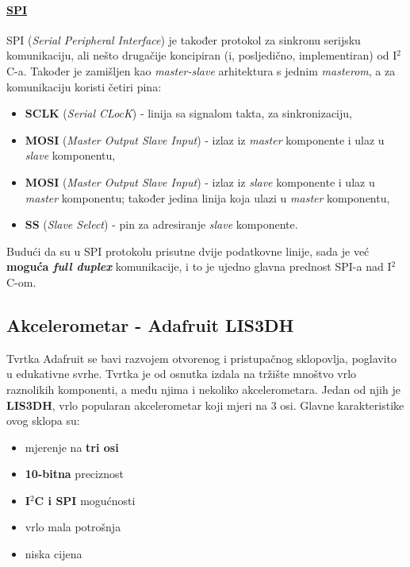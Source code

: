 \documentclass[12pt,a4paper]{article}
\begin{document}
	\paragraph{\underline{SPI}} %
	\label{par:spi}
		SPI (\textit{Serial Peripheral Interface}) je također protokol za sinkronu serijsku komunikaciju, ali nešto drugačije koncipiran (i, posljedično, implementiran) od I$^2$C-a. Također je zamišljen kao \textit{master-slave} arhitektura s jednim \textit{masterom}, a za komunikaciju koristi četiri pina:
		\begin{itemize}
			\item \textbf{SCLK} (\textit{Serial CLocK}) - linija sa signalom takta, za sinkronizaciju,
			\item \textbf{MOSI} (\textit{Master Output Slave Input}) - izlaz iz \textit{master} komponente i ulaz u \textit{slave} komponentu,
			\item \textbf{MOSI} (\textit{Master Output Slave Input}) - izlaz iz \textit{slave} komponente i ulaz u \textit{master} komponentu; također jedina linija koja ulazi u \textit{master} komponentu,
			\item \textbf{SS} (\textit{Slave Select}) - pin za adresiranje \textit{slave} komponente.
		\end{itemize}

		Budući da su u SPI protokolu prisutne dvije podatkovne linije, sada je već \textbf{moguća \textit{full duplex}} komunikacije, i to je ujedno glavna prednost SPI-a nad I$^2$C-om.

	\newpage
	\subsection{Akcelerometar - Adafruit LIS3DH}
		Tvrtka Adafruit se bavi razvojem otvorenog i pristupačnog sklopovlja, poglavito u edukativne svrhe. Tvrtka je od osnutka izdala na tržište mnoštvo vrlo raznolikih komponenti, a među njima i nekoliko akcelerometara. Jedan od njih je \textbf{LIS3DH}, vrlo popularan akcelerometar koji mjeri na 3 osi. Glavne karakteristike ovog sklopa su:
		\begin{itemize}
			\item mjerenje na \textbf{tri osi}
			\item \textbf{10-bitna} preciznost
			\item \textbf{I$^2$C i SPI} mogućnosti
			\item vrlo mala potrošnja
			\item niska cijena
		\end{itemize}
\end{document}
